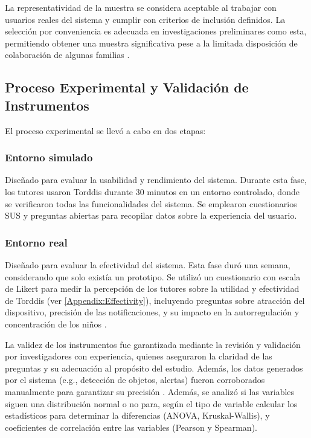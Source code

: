 			La representatividad de la muestra se considera aceptable al trabajar con usuarios reales del sistema y cumplir con criterios de inclusión definidos. La selección por conveniencia es adecuada en investigaciones preliminares como esta, permitiendo obtener una muestra significativa pese a la limitada disposición de colaboración de algunas familias \citep{DiPietro2025Meta}.
		
		\subsection{Proceso Experimental y Validación de Instrumentos}
			El proceso experimental se llevó a cabo en dos etapas:
		
			\subsubsection{Entorno simulado}
				Diseñado para evaluar la usabilidad y rendimiento del sistema. Durante esta fase, los tutores usaron Torddis durante 30 minutos en un entorno controlado, donde se verificaron todas las funcionalidades del sistema. Se emplearon cuestionarios SUS y preguntas abiertas para recopilar datos sobre la experiencia del usuario.
			
			\subsubsection{Entorno real}
				Diseñado para evaluar la efectividad del sistema. Esta fase duró una semana, considerando que solo existía un prototipo. Se utilizó un cuestionario con escala de Likert para medir la percepción de los tutores sobre la utilidad y efectividad de Torddis (ver \ref{Appendix:Effectivity}), incluyendo preguntas sobre atracción del dispositivo, precisión de las notificaciones, y su impacto en la autorregulación y concentración de los niños \citep{Ackermans2025Young}.
			
				La validez de los instrumentos fue garantizada mediante la revisión y validación por investigadores con experiencia, quienes aseguraron la claridad de las preguntas y su adecuación al propósito del estudio. Además, los datos generados por el sistema (e.g., detección de objetos, alertas) fueron corroborados manualmente para garantizar su precisión \citep{Wang2025Development}. Además, se analizó si las variables siguen una distribución normal o no para, según el tipo de variable calcular los estadísticos para determinar la diferencias (ANOVA, Kruskal-Wallis), y coeficientes de correlación entre las variables (Pearson y Spearman).
		
